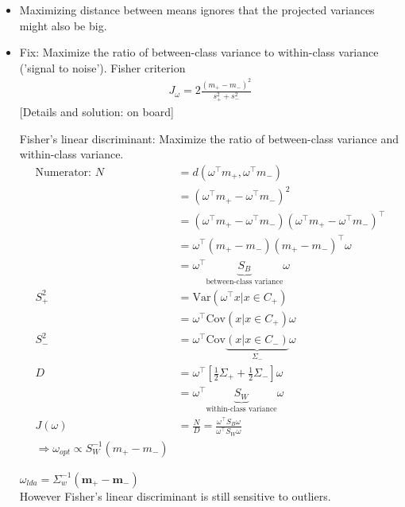 \begin{itemize}
\item  Maximizing distance between means ignores that the projected variances might also be big. 
\item  Fix:  Maximize the ratio of between-class variance to within-class variance ('signal to noise'). Fisher criterion
\begin{align}
	J_\omega = 2\frac{(m_+-m_-)^2}{s_+^2+s_-^2}
\end{align}
[Details and solution: on board]

\begin{bbbox}{Fisher's linear discriminant: Maximize the ratio of between-class variance and within-class variance.}
	\begin{align*}
		\text{Numerator: } N &= d\left( \omega^{\top}m_+, \omega^{\top}m_- \right) \\
		                     &= \left( \omega^{\top} m_+ - \omega^{\top} m_- \right)^2 \\
		  &= \left( \omega^{\top} m_+ - \omega^{\top} m_- \right) \left( \omega^{\top} m_+ - \omega^{\top} m_- \right)^{\top} \\
		  &= \omega^{\top} (m_+-m_-) (m_+-m_-)^{\top} \omega \\
		  &= \omega^{\top} \underbrace{S_B}_{\text{between-class variance}} \omega \\
		S_+^2 &= \mbox{Var}	\left( \omega^{\top} x | x \in C_+ \right) \\
			  &= \omega^{\top} \mbox{Cov}	\left( x | x \in C_+ \right) \omega \\
        S_-^2 &= \omega^{\top} \mbox{Cov}	\underbrace{\left( x | x \in C_- \right)}_{\Sigma_-} \omega \\
        D &= \omega^{\top} \left[ \frac{1}{2} \Sigma_+ + \frac{1}{2} \Sigma_- \right] \omega \\
          &= \omega^{\top} \underbrace{S_W}_{\text{within-class variance}} \omega \\
        J(\omega) &= \frac{N}{D} = \frac{\omega^{\top} S_B \omega}{\omega^{\top} S_W \omega} \\
        \Rightarrow \omega_{opt} \propto S_W^{-1} \left(m_+ - m_- \right)
	\end{align*}
\end{bbbox}

 
$\omega_{lda}= \Sigma_w^{-1} (\mathbf{m}_+-\mathbf{m}_-)$ \\
However Fisher's linear discriminant is still sensitive to outliers.
\end{itemize}

